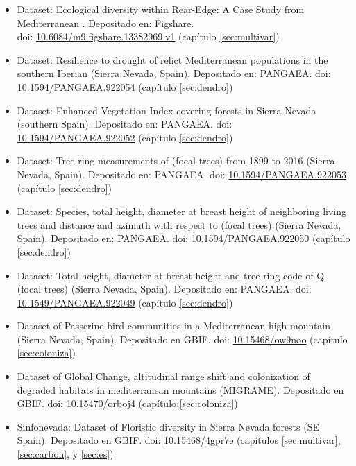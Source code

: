 \begin{itemize}
    \item Dataset: Ecological diversity within Rear-Edge: A Case Study from Mediterranean \Qpw. Depositado en: Figshare. \\
    doi: \href{https://doi.org/10.6084/m9.figshare.13382969.v1}{10.6084/m9.figshare.13382969.v1} (capítulo \ref{sec:multivar})
    \item Dataset: Resilience to drought of relict Mediterranean \Qpy populations in the southern Iberian (Sierra Nevada, Spain). Depositado en: PANGAEA. doi: \href{https://doi.pangaea.de/10.1594/PANGAEA.922054}{10.1594/PANGAEA.922054} (capítulo \ref{sec:dendro})
    \item Dataset: Enhanced Vegetation Index covering \Qpy forests in Sierra Nevada (southern Spain). Depositado en: PANGAEA. doi: \href{https://doi.pangaea.de/10.1594/PANGAEA.922052}{10.1594/PANGAEA.922052} (capítulo \ref{sec:dendro})
    \item Dataset: Tree-ring measurements of \Qpy (focal trees) from 1899 to 2016 (Sierra Nevada, Spain). Depositado en: PANGAEA. doi: \href{https://doi.pangaea.de/10.1594/PANGAEA.922053}{10.1594/PANGAEA.922053} (capítulo \ref{sec:dendro})
    \item Dataset: Species, total height, diameter at breast height of neighboring living trees and distance and azimuth with respect to \Qpy (focal trees) (Sierra Nevada, Spain). Depositado en: PANGAEA. doi: \href{https://doi.pangaea.de/10.1594/PANGAEA.922050}{10.1594/PANGAEA.922050} (capítulo \ref{sec:dendro})
    \item Dataset: Total height, diameter at breast height and tree ring code of Q \Qpy (focal trees) (Sierra Nevada, Spain). Depositado en: PANGAEA. doi: \href{https://doi.pangaea.de/10.1594/PANGAEA.922050}{10.1549/PANGAEA.922049} (capítulo \ref{sec:dendro})
    \item Dataset of Passerine bird communities in a Mediterranean high mountain (Sierra Nevada, Spain). Depositado en GBIF. doi: \href{https://doi.org/10.15468/ow9noo}{10.15468/ow9noo} (capítulo \ref{sec:coloniza})
    \item Dataset of Global Change, altitudinal range shift and colonization of degraded habitats in mediterranean mountains (MIGRAME). Depositado en GBIF. doi: \href{https://doi.org/10.15470/orboj4}{10.15470/orboj4} (capítulo \ref{sec:coloniza})
    \item Sinfonevada: Dataset of Floristic diversity in Sierra Nevada forests (SE Spain). Depositado en GBIF. doi: \href{https://doi.org/10.15468/4gpr7e}{10.15468/4gpr7e} (capítulos \ref{sec:multivar}, \ref{sec:carbon}, y \ref{sec:es})
\end{itemize}

